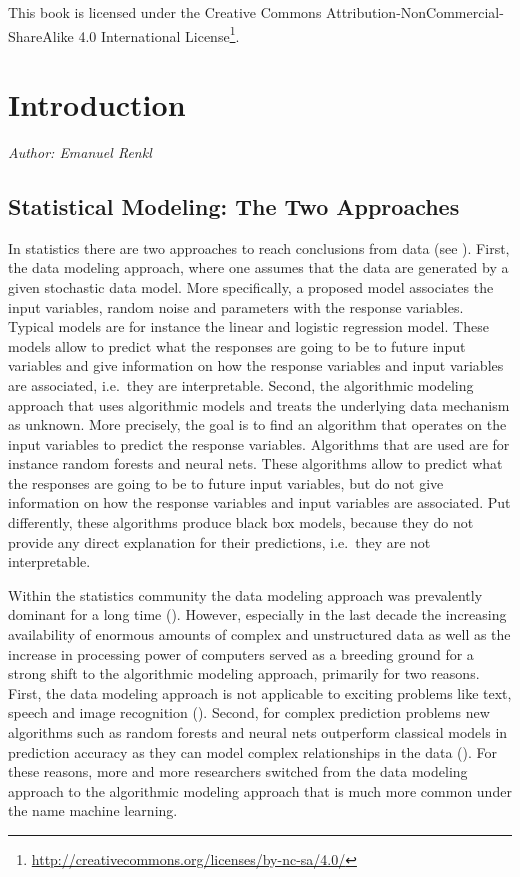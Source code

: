 \documentclass[
]{krantz}
\renewcommand{\href}[2]{#2\footnote{\url{#1}}}
\begin{document}
This book is licensed under the \href{http://creativecommons.org/licenses/by-nc-sa/4.0/}{Creative Commons Attribution-NonCommercial-ShareAlike 4.0 International License}.

\mainmatter

\hypertarget{introduction}{%
\chapter{Introduction}\label{introduction}}

\emph{Author: Emanuel Renkl}

\hypertarget{statistical-modeling-the-two-approaches}{%
\section{Statistical Modeling: The Two Approaches}\label{statistical-modeling-the-two-approaches}}

In statistics there are two approaches to reach conclusions from data (see \citet{breiman2001}). First, the data modeling approach, where one assumes that the data are generated by a given stochastic data model. More specifically, a proposed model associates the input variables, random noise and parameters with the response variables. Typical models are for instance the linear and logistic regression model. These models allow to predict what the responses are going to be to future input variables and give information on how the response variables and input variables are associated, i.e.~they are interpretable. Second, the algorithmic modeling approach that uses algorithmic models and treats the underlying data mechanism as unknown. More precisely, the goal is to find an algorithm that operates on the input variables to predict the response variables. Algorithms that are used are for instance random forests and neural nets. These algorithms allow to predict what the responses are going to be to future input variables, but do not give information on how the response variables and input variables are associated. Put differently, these algorithms produce black box models, because they do not provide any direct explanation for their predictions, i.e.~they are not interpretable.

Within the statistics community the data modeling approach was prevalently dominant for a long time (\citet{breiman2001}). However, especially in the last decade the increasing availability of enormous amounts of complex and unstructured data as well as the increase in processing power of computers served as a breeding ground for a strong shift to the algorithmic modeling approach, primarily for two reasons.\\
First, the data modeling approach is not applicable to exciting problems like text, speech and image recognition (\citet{breiman2001}). Second, for complex prediction problems new algorithms such as random forests and neural nets outperform classical models in prediction accuracy as they can model complex relationships in the data (\citet{breiman2001}).
For these reasons, more and more researchers switched from the data modeling approach to the algorithmic modeling approach that is much more common under the name machine learning.
\end{document}
